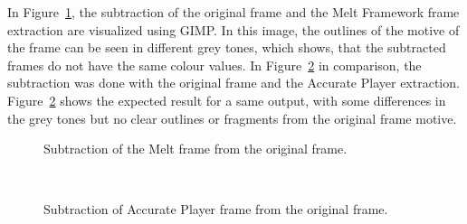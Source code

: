 \documentclass[../MasterThesis.tex]{subfiles}
\begin{document}
\vspace*{1.5em}
In Figure~\ref{figure:oVSmelt}, the subtraction of the original frame and the Melt Framework frame extraction are visualized using GIMP. In this image, the outlines of the motive of the frame can be seen in different grey tones, which shows, that the subtracted frames do not have the same colour values.
In Figure~\ref{figure:oVSap} in comparison, the subtraction was done with the original frame and the Accurate Player extraction. Figure~\ref{figure:oVSap} shows the expected result for a same output, with some differences in the grey tones but no clear outlines or fragments from the original frame motive.



\begin{minipage}{0.48\textwidth}
	\begin{figure}[H]
		\begin{center}
			\caption[Subtraction of the Melt frame from the original frame.]{Subtraction of the Melt frame from the original frame.}
			\label{figure:oVSmelt}
		\end{center}
	\end{figure}
\end{minipage}\begin{minipage}{0.04\textwidth}
	\ 
\end{minipage}\begin{minipage}{0.48\textwidth}
	\begin{figure}[H]
		\begin{center}
			\caption[Subtraction of Accurate Player frame from the original frame.]{Subtraction of Accurate Player frame from the original frame.}
			\label{figure:oVSap}
		\end{center}
	\end{figure}
\end{minipage}





\end{document}
